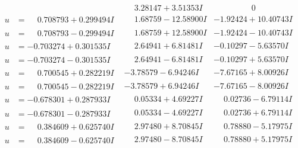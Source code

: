 \documentclass[1p]{elsarticle_modified}
\theoremstyle{definition}
\begin{document}
$$\begin{array}{c|c|c}
 & \phantom{-}3.28147 + 3.51353 I & \phantom{-0.000000 } 0 \\ \hline\begin{aligned}
u &= \phantom{-}0.708793 + 0.299494 I\end{aligned}
 & \phantom{-}1.68759 - 12.58900 I & -1.92424 + 10.40743 I \\ \hline\begin{aligned}
u &= \phantom{-}0.708793 - 0.299494 I\end{aligned}
 & \phantom{-}1.68759 + 12.58900 I & -1.92424 - 10.40743 I \\ \hline\begin{aligned}
u &= -0.703274 + 0.301535 I\end{aligned}
 & \phantom{-}2.64941 + 6.81481 I & -0.10297 - 5.63570 I \\ \hline\begin{aligned}
u &= -0.703274 - 0.301535 I\end{aligned}
 & \phantom{-}2.64941 - 6.81481 I & -0.10297 + 5.63570 I \\ \hline\begin{aligned}
u &= \phantom{-}0.700545 + 0.282219 I\end{aligned}
 & -3.78579 - 6.94246 I & -7.67165 + 8.00926 I \\ \hline\begin{aligned}
u &= \phantom{-}0.700545 - 0.282219 I\end{aligned}
 & -3.78579 + 6.94246 I & -7.67165 - 8.00926 I \\ \hline\begin{aligned}
u &= -0.678301 + 0.287933 I\end{aligned}
 & \phantom{-}0.05334 + 4.69227 I & \phantom{-}0.02736 - 6.79114 I \\ \hline\begin{aligned}
u &= -0.678301 - 0.287933 I\end{aligned}
 & \phantom{-}0.05334 - 4.69227 I & \phantom{-}0.02736 + 6.79114 I \\ \hline\begin{aligned}
u &= \phantom{-}0.384609 + 0.625740 I\end{aligned}
 & \phantom{-}2.97480 + 8.70845 I & \phantom{-}0.78880 - 5.17975 I \\ \hline\begin{aligned}
u &= \phantom{-}0.384609 - 0.625740 I\end{aligned}
 & \phantom{-}2.97480 - 8.70845 I & \phantom{-}0.78880 + 5.17975 I \\ \hline\begin{aligned}

\end{aligned}
\end{array}$$
\end{document}

